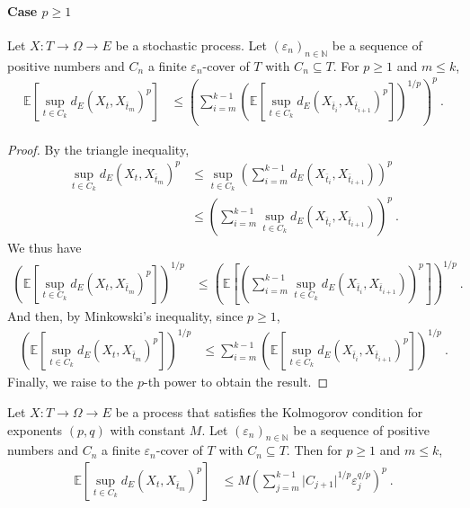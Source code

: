 \paragraph{Case $p \ge 1$}


\begin{lemma}\label{lem:integral_sup_dist_le_sum_rpow}
  \leanok
Let $X : T \to \Omega \to E$ be a stochastic process.
Let $(\varepsilon_n)_{n \in \mathbb{N}}$ be a sequence of positive numbers and $C_n$ a finite $\varepsilon_n$-cover of $T$ with $C_n \subseteq T$.
For $p \ge 1$ and $m \le k$,
\begin{align*}
  \mathbb{E}\left[\sup_{t \in C_k} d_E(X_t, X_{\bar{t}_m})^p \right]
  &\le \left(\sum_{i=m}^{k-1} \left( \mathbb{E}\left[\sup_{t \in C_k} d_E(X_{\bar{t}_i}, X_{\bar{t}_{i+1}})^p\right] \right)^{1/p}\right)^p
  \: .
\end{align*}
\end{lemma}

\begin{proof}\leanok
By the triangle inequality,
\begin{align*}
  \sup_{t \in C_k} d_E(X_t, X_{\bar{t}_m})^p
  &\le \sup_{t \in C_k} \left( \sum_{i=m}^{k-1} d_E(X_{\bar{t}_i}, X_{\bar{t}_{i+1}}) \right)^p
  \\
  &\le \left( \sum_{i=m}^{k-1} \sup_{t \in C_k} d_E(X_{\bar{t}_i}, X_{\bar{t}_{i+1}}) \right)^p
  \: .
\end{align*}
We thus have
\begin{align*}
  \left(\mathbb{E} \left[\sup_{t \in C_k} d_E(X_t, X_{\bar{t}_m})^p \right]\right)^{1/p}
  &\le \left(\mathbb{E} \left[\left( \sum_{i=m}^{k-1} \sup_{t \in C_k} d_E(X_{\bar{t}_i}, X_{\bar{t}_{i+1}}) \right)^p\right]\right)^{1/p}
  \: .
\end{align*}
And then, by Minkowski's inequality, since $p \ge 1$,
\begin{align*}
  \left(\mathbb{E} \left[\sup_{t \in C_k} d_E(X_t, X_{\bar{t}_m})^p \right]\right)^{1/p}
  &\le \sum_{i=m}^{k-1} \left( \mathbb{E}\left[\sup_{t \in C_k} d_E(X_{\bar{t}_i}, X_{\bar{t}_{i+1}})^p \right] \right)^{1/p}
  \: .
\end{align*}
Finally, we raise to the $p$-th power to obtain the result.
\end{proof}


\begin{lemma}\label{lem:integral_sup_rpow_dist_le_sum}
  \leanok
Let $X : T \to \Omega \to E$ be a process that satisfies the Kolmogorov condition for exponents $(p,q)$ with constant $M$.
Let $(\varepsilon_n)_{n \in \mathbb{N}}$ be a sequence of positive numbers and $C_n$ a finite $\varepsilon_n$-cover of $T$ with $C_n \subseteq T$.
Then for $p \ge 1$ and $m \le k$,
\begin{align*}
  \mathbb{E} \left[\sup_{t \in C_k} d_E(X_t, X_{\bar{t}_m})^p \right]
  &\le M \left( \sum_{j=m}^{k-1} \vert C_{j+1} \vert^{1/p} \varepsilon_j^{q/p} \right)^p
  \: .
\end{align*}
\end{lemma}

